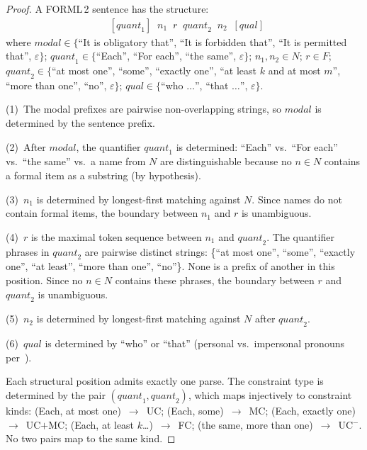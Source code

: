 \documentclass[acmsmall,screen,review]{acmart}
\begin{document}
\begin{proof}
A FORML\,2 sentence has the structure:
\begin{align*}
[\mathit{modal}] \;\; [\mathit{quant}_1] \;\; n_1 \;\; r \;\; \mathit{quant}_2 \;\; n_2 \;\; [\mathit{qual}]
\end{align*}
where $\mathit{modal} \in \{$``It is obligatory that'', ``It is forbidden that'', ``It is permitted that'', $\varepsilon\}$; $\mathit{quant}_1 \in \{$``Each'', ``For each'', ``the same'', $\varepsilon\}$; $n_1, n_2 \in N$; $r \in F$; $\mathit{quant}_2 \in \{$``at most one'', ``some'', ``exactly one'', ``at least $k$ and at most $m$'', ``more than one'', ``no'', $\varepsilon\}$; $\mathit{qual} \in \{$``who $\ldots$'', ``that $\ldots$'', $\varepsilon\}$.

\medskip\noindent
(1)~The modal prefixes are pairwise non-overlapping strings, so $\mathit{modal}$ is determined by the sentence prefix.

(2)~After $\mathit{modal}$, the quantifier $\mathit{quant}_1$ is determined: ``Each'' vs.\ ``For each'' vs.\ ``the same'' vs.\ a name from $N$ are distinguishable because no $n \in N$ contains a formal item as a substring (by hypothesis).

(3)~$n_1$ is determined by longest-first matching against $N$. Since names do not contain formal items, the boundary between $n_1$ and $r$ is unambiguous.

(4)~$r$ is the maximal token sequence between $n_1$ and $\mathit{quant}_2$. The quantifier phrases in $\mathit{quant}_2$ are pairwise distinct strings: \{``at most one'', ``some'', ``exactly one'', ``at least'', ``more than one'', ``no''\}. None is a prefix of another in this position. Since no $n \in N$ contains these phrases, the boundary between $r$ and $\mathit{quant}_2$ is unambiguous.

(5)~$n_2$ is determined by longest-first matching against $N$ after $\mathit{quant}_2$.

(6)~$\mathit{qual}$ is determined by ``who'' or ``that'' (personal vs.\ impersonal pronouns per~\cite[Sec.\,1.5]{halpin06b}).

Each structural position admits exactly one parse. The constraint type is determined by the pair $(\mathit{quant}_1, \mathit{quant}_2)$, which maps injectively to constraint kinds: (Each, at most one)~$\to$~UC; (Each, some)~$\to$~MC; (Each, exactly one)~$\to$~UC$+$MC; (Each, at least $k$\ldots)~$\to$~FC; (the same, more than one)~$\to$~UC$^{-}$. No two pairs map to the same kind.
\end{proof}
\end{document}
